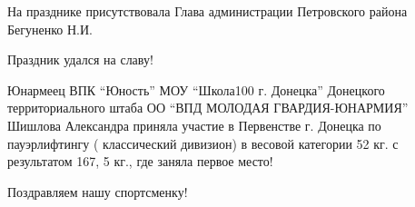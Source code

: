 На празднике присутствовала Глава администрации Петровского района Бегуненко
Н.И.

Праздник удался на славу!



Юнармеец ВПК \enquote{Юность} МОУ \enquote{Школа100 г. Донецка} Донецкого территориального штаба
ОО \enquote{ВПД МОЛОДАЯ ГВАРДИЯ-ЮНАРМИЯ} Шишлова Александра приняла участие в
Первенстве г. Донецка по пауэрлифтингу ( классический дивизион) в весовой
категории 52 кг. с результатом 167, 5 кг., где заняла первое место!

Поздравляем нашу спортсменку!

